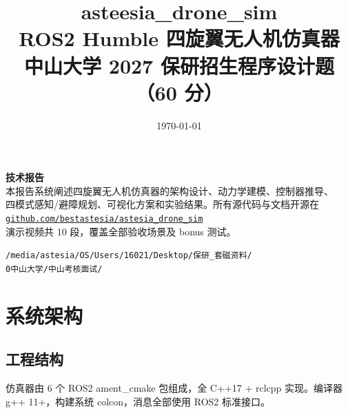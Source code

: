 \documentclass[12pt,a4paper]{article}
\title{
  {\LARGE\bfseries asteesia\_drone\_sim}\\[4pt]
  {\large ROS2 Humble 四旋翼无人机仿真器}\\[10pt]
  {\normalsize 中山大学 2027 保研招生程序设计题（60 分）}
}
\author{}
\date{\today}
\begin{document}
\maketitle
\thispagestyle{empty}

\vspace{20pt}
\begin{center}
\begin{minipage}{0.78\textwidth}
\centering
\textbf{技术报告}\\[6pt]
本报告系统阐述四旋翼无人机仿真器的架构设计、动力学建模、控制器推导、\\
四模式感知/避障规划、可视化方案和实验结果。所有源代码与文档开源在\\[4pt]
\href{https://github.com/bestastesia/astesia_drone_sim}
     {\texttt{github.com/bestastesia/astesia\_drone\_sim}}\\[4pt]
演示视频共 10 段，覆盖全部验收场景及 bonus 测试。
\end{minipage}
\end{center}
\vspace{10pt}

\begin{tcolorbox}[colback=yellow!5, colframe=yellow!60, title={演示视频路径}]
  \small\texttt{/media/astesia/OS/Users/16021/Desktop/保研\_套磁资料/}\\
  \texttt{0中山大学/中山考核面试/}
\end{tcolorbox}

\newpage
\setcounter{tocdepth}{1}
\tableofcontents
\newpage

\section{系统架构}

\subsection{工程结构}

仿真器由 6 个 ROS2 ament\_cmake 包组成，全 C++17 + rclcpp 实现。编译器 g++ 11+，构建系统 colcon，消息全部使用 ROS2 标准接口。
\end{document}
